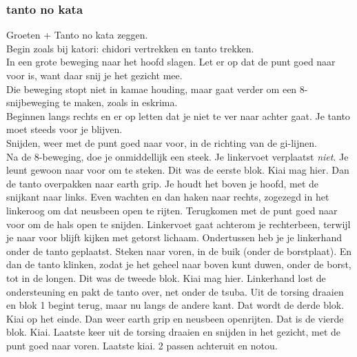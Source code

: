 \subsubsection{tanto no kata}
Groeten + Tanto no kata zeggen.\\
Begin zoals bij katori: chidori vertrekken en tanto trekken.\\
In een grote beweging naar het hoofd slagen. Let er op dat de punt goed naar voor is, want daar snij je het gezicht mee.\\
Die beweging stopt niet in kamae houding, maar gaat verder om een 8-snijbeweging te maken, zoals in eskrima.\\
Beginnen langs rechts en er op letten dat je niet te ver naar achter gaat. Je tanto moet steeds voor je blijven.\\
Snijden, weer met de punt goed naar voor, in de richting van de gi-lijnen.\\
Na de 8-beweging, doe je onmiddellijk een steek. Je linkervoet verplaatst \textit{niet}. Je leunt gewoon naar voor om te steken.
Dit was de eerste blok. Kiai mag hier.
Dan de tanto overpakken naar earth grip. Je houdt het boven je hoofd, met de snijkant naar links.
Even wachten en dan haken naar rechts, zogezegd in het linkeroog om dat neusbeen open te rijten. Terugkomen met de punt goed naar voor om de hals open te snijden. Linkervoet gaat achterom je rechterbeen, terwijl je naar voor blijft kijken met getorst lichaam. Ondertussen heb je je linkerhand onder de tanto geplaatst. Steken naar voren, in de buik (onder de borstplaat). En dan de tanto klinken, zodat je het geheel naar boven kunt duwen, onder de borst, tot in de longen.
Dit was de tweede blok. Kiai mag hier.
Linkerhand lost de ondersteuning en pakt de tanto over, net onder de tsuba. Uit de torsing draaien en blok 1 begint terug, maar nu langs de andere kant.
Dat wordt de derde blok. Kiai op het einde.
Dan weer earth grip en neusbeen openrijten. Dat is de vierde blok. Kiai.
Laatste keer uit de torsing draaien en snijden in het gezicht, met de punt goed naar voren. Laatste kiai.
2 passen achteruit en notou.

